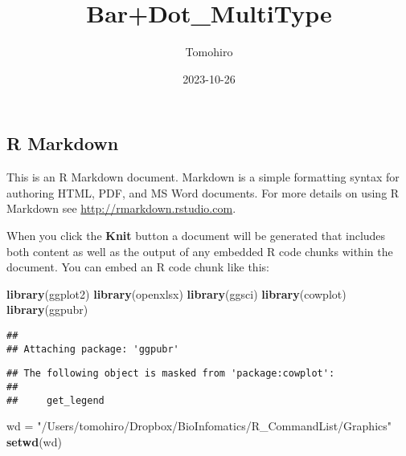 \documentclass[
  a4paper,
  number-of-lines=30,
  textwidth=40zw]{bxjsarticle}
\title{Bar+Dot\_MultiType}
\author{Tomohiro}
\date{2023-10-26}
\newenvironment{Shaded}{\begin{snugshade}}{\end{snugshade}}
\newcommand{\FunctionTok}[1]{\textcolor[rgb]{0.13,0.29,0.53}{\textbf{#1}}}
\newcommand{\NormalTok}[1]{#1}
\newcommand{\OtherTok}[1]{\textcolor[rgb]{0.56,0.35,0.01}{#1}}
\newcommand{\StringTok}[1]{\textcolor[rgb]{0.31,0.60,0.02}{#1}}
\begin{document}
\maketitle

\hypertarget{r-markdown}{%
\subsection{R Markdown}\label{r-markdown}}

This is an R Markdown document. Markdown is a simple formatting syntax
for authoring HTML, PDF, and MS Word documents. For more details on
using R Markdown see \url{http://rmarkdown.rstudio.com}.

When you click the \textbf{Knit} button a document will be generated
that includes both content as well as the output of any embedded R code
chunks within the document. You can embed an R code chunk like this:

\begin{Shaded}
\begin{Highlighting}[]
\FunctionTok{library}\NormalTok{(ggplot2)}
\FunctionTok{library}\NormalTok{(openxlsx)}
\FunctionTok{library}\NormalTok{(ggsci)}
\FunctionTok{library}\NormalTok{(cowplot)}
\FunctionTok{library}\NormalTok{(ggpubr)}
\end{Highlighting}
\end{Shaded}

\begin{verbatim}
## 
## Attaching package: 'ggpubr'
\end{verbatim}

\begin{verbatim}
## The following object is masked from 'package:cowplot':
## 
##     get_legend
\end{verbatim}

\begin{Shaded}
\begin{Highlighting}[]
\NormalTok{wd }\OtherTok{=} \StringTok{"/Users/tomohiro/Dropbox/BioInfomatics/R\_CommandList/Graphics"}
\FunctionTok{setwd}\NormalTok{(wd)}
\end{Highlighting}
\end{Shaded}
\end{document}
